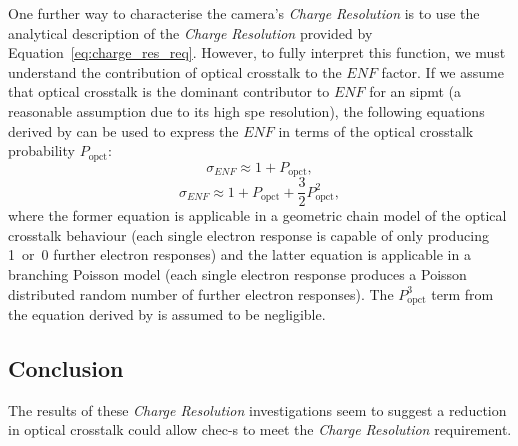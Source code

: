 One further way to characterise the camera's \textit{Charge Resolution} is to use the analytical description of the \textit{Charge Resolution} provided by Equation~\ref{eq:charge_res_req}. However, to fully interpret this function, we must understand the contribution of optical crosstalk to the $\mathit{ENF}$ factor. If we assume that optical crosstalk is the dominant contributor to $\mathit{ENF}$ for an \gls{sipmt} (a reasonable assumption due to its high \gls{spe} resolution), the following equations derived by \textcite{Vinogradov2012} can be used to express the $\mathit{ENF}$ in terms of the optical crosstalk probability $P_\text{opct}$:
\begin{equation} \label{eq:opct_geometric}
\sigma_{ENF} \approx 1 + P_\text{opct},
\end{equation}
\begin{equation} \label{eq:opct_branching}
\sigma_{ENF} \approx 1 + P_\text{opct} + \frac{3}{2} P_\text{opct}^2,
\end{equation}
where the former equation is applicable in a geometric chain model of the optical crosstalk behaviour (each single electron response is capable of only producing 1~or~0 further electron responses) and the latter equation is applicable in a branching Poisson model (each single electron response produces a Poisson distributed random number of further electron responses). The $P_\text{opct}^3$ term from the equation derived by \textcite{Vinogradov2012} is assumed to be negligible.

\subsection{Conclusion}

The results of these \textit{Charge Resolution} investigations seem to suggest a reduction in optical crosstalk could allow \gls{chec-s} to meet the \textit{Charge Resolution} requirement. 




